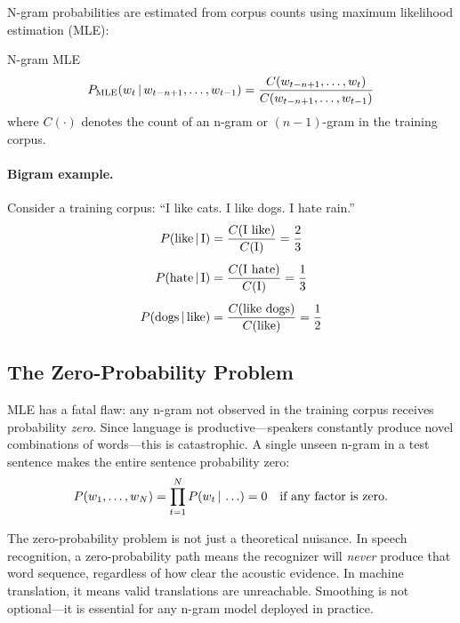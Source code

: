 N-gram probabilities are estimated from corpus counts using maximum likelihood
estimation (MLE):

\begin{mathresult}{N-gram MLE}
\begin{equation}
P_{\text{MLE}}(w_t \,|\, w_{t-n+1}, \ldots, w_{t-1})
= \frac{C(w_{t-n+1}, \ldots, w_t)}{C(w_{t-n+1}, \ldots, w_{t-1})}
\label{eq:ngram_mle}
\end{equation}
where $C(\cdot)$ denotes the count of an n-gram or $(n{-}1)$-gram in the
training corpus.
\end{mathresult}

\paragraph{Bigram example.}
Consider a training corpus: ``I like cats. I like dogs. I hate rain.''
\begin{align*}
P(\text{like} \,|\, \text{I}) &= \frac{C(\text{I like})}{C(\text{I})} = \frac{2}{3} \\[4pt]
P(\text{hate} \,|\, \text{I}) &= \frac{C(\text{I hate})}{C(\text{I})} = \frac{1}{3} \\[4pt]
P(\text{dogs} \,|\, \text{like}) &= \frac{C(\text{like dogs})}{C(\text{like})} = \frac{1}{2}
\end{align*}

\subsection{The Zero-Probability Problem}

MLE has a fatal flaw: any n-gram not observed in the training corpus receives
probability \emph{zero}.  Since language is productive---speakers constantly
produce novel combinations of words---this is catastrophic.  A single unseen
n-gram in a test sentence makes the entire sentence probability zero:
\[
P(w_1, \ldots, w_N) = \prod_{t=1}^{N} P(w_t \,|\, \ldots) = 0
\quad\text{if any factor is zero.}
\]

\begin{warningbox}
The zero-probability problem is not just a theoretical nuisance.  In speech
recognition, a zero-probability path means the recognizer will \emph{never}
produce that word sequence, regardless of how clear the acoustic evidence.
In machine translation, it means valid translations are unreachable.
Smoothing is not optional---it is essential for any n-gram model deployed in
practice.
\end{warningbox}

